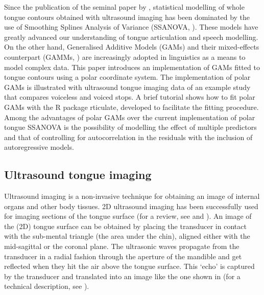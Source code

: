 \documentclass[
  11pt,
]{article}
\begin{document}
Since the publication of the seminal paper by \citet{davidson2006},
statistical modelling of whole tongue contours obtained with ultrasound
imaging has been dominated by the use of Smoothing Splines Analysis of
Variance (SSANOVA, \citealt{gu2013}). These models have greatly advanced
our understanding of tongue articulation and speech modelling. On the
other hand, Generalised Additive Models (GAMs) and their mixed-effects
counterpart (GAMMs, \citealt{wood2006}) are increasingly adopted in
linguistics as a means to model complex data. This paper introduces an
implementation of GAMs fitted to tongue contours using a polar
coordinate system. The implementation of polar GAMs is illustrated with
ultrasound tongue imaging data of an example study that compares
voiceless and voiced stops. A brief tutorial shows how to fit polar GAMs
with the R package rticulate, developed to facilitate the fitting
procedure. Among the advantages of polar GAMs over the current
implementation of polar tongue SSANOVA is the possibility of modelling
the effect of multiple predictors and that of controlling for
autocorrelation in the residuals with the inclusion of autoregressive
models.

\hypertarget{ultrasound-tongue-imaging}{%
\subsection{Ultrasound tongue imaging}\label{ultrasound-tongue-imaging}}

Ultrasound imaging is a non-invasive technique for obtaining an image of
internal organs and other body tissues. 2D ultrasound imaging has been
successfully used for imaging sections of the tongue surface (for a
review, see \citealt{gick2002} and \citealt{lulich2018}). An image of
the (2D) tongue surface can be obtained by placing the transducer in
contact with the sub-mental triangle (the area under the chin), aligned
either with the mid-sagittal or the coronal plane. The ultrasonic waves
propagate from the transducer in a radial fashion through the aperture
of the mandible and get reflected when they hit the air above the tongue
surface. This `echo' is captured by the transducer and translated into
an image like the one shown in  (for a technical
description, see \citealt{stone2005}).
\end{document}
